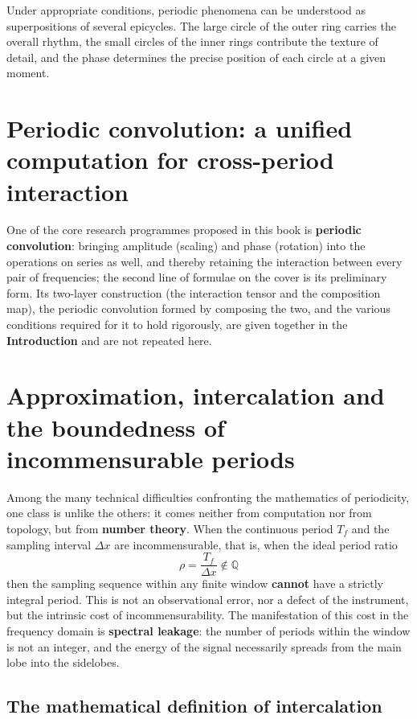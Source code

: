 Under appropriate conditions, periodic phenomena can be understood as superpositions of several epicycles. The large circle of the outer ring carries the overall rhythm, the small circles of the inner rings contribute the texture of detail, and the phase determines the precise position of each circle at a given moment.

\section*{Periodic convolution: a unified computation for cross-period interaction}

One of the core research programmes proposed in this book is \textbf{periodic convolution}: bringing amplitude (scaling) and phase (rotation) into the operations on series as well, and thereby retaining the interaction between every pair of frequencies; the second line of formulae on the cover is its preliminary form. Its two-layer construction (the interaction tensor and the composition map), the periodic convolution formed by composing the two, and the various conditions required for it to hold rigorously, are given together in the \textbf{Introduction} and are not repeated here.

\section*{Approximation, intercalation and the boundedness of incommensurable periods}

Among the many technical difficulties confronting the mathematics of periodicity, one class is unlike the others: it comes neither from computation nor from topology, but from \textbf{number theory}. When the continuous period $T_f$ and the sampling interval $\Delta x$ are incommensurable, that is, when the ideal period ratio
\[
\rho = \frac{T_f}{\Delta x} \notin \mathbb{Q}
\]
then the sampling sequence within any finite window \textbf{cannot} have a strictly integral period. This is not an observational error, nor a defect of the instrument, but the intrinsic cost of incommensurability. The manifestation of this cost in the frequency domain is \textbf{spectral leakage}: the number of periods within the window is not an integer, and the energy of the signal necessarily spreads from the main lobe into the sidelobes.

\subsection*{The mathematical definition of intercalation}

